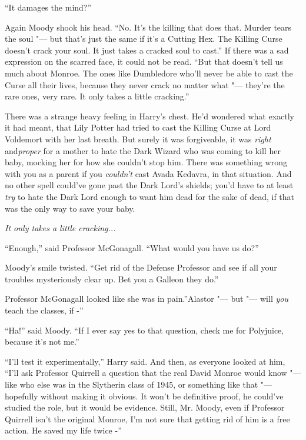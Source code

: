 ``It damages the mind?''

Again Moody shook his head. ``No. It's the killing that does that.
Murder tears the soul "--- but that's just the same if it's a Cutting Hex.
The Killing Curse doesn't crack your soul. It just takes a cracked soul
to cast.'' If there was a sad expression on the scarred face, it could
not be read. ``But that doesn't tell us much about Monroe. The ones like
Dumbledore who'll never be able to cast the Curse all their lives,
because they never crack no matter what "--- they're the rare ones, very
rare. It only takes a little cracking.''

There was a strange heavy feeling in Harry's chest. He'd wondered what
exactly it had meant, that Lily Potter had tried to cast the Killing
Curse at Lord Voldemort with her last breath. But surely it was
forgiveable, it was \emph{right} and\emph{proper} for a mother to hate
the Dark Wizard who was coming to kill her baby, mocking her for how she
couldn't stop him. There was something wrong with you as a parent if you
\emph{couldn't} cast Avada Kedavra, in that situation. And no other
spell could've gone past the Dark Lord's shields; you'd have to at least
\emph{try} to hate the Dark Lord enough to want him dead for the sake of
dead, if that was the only way to save your baby.

\emph{It only takes a little cracking...}

``Enough,'' said Professor McGonagall. ``What would you have us do?''

Moody's smile twisted. ``Get rid of the Defense Professor and see if all
your troubles mysteriously clear up. Bet you a Galleon they do.''

Professor McGonagall looked like she was in pain.''Alastor "--- but "--- will
\emph{you} teach the classes, if -''

``Ha!'' said Moody. ``If I ever say yes to that question, check me for
Polyjuice, because it's not me.''

``I'll test it experimentally,'' Harry said. And then, as everyone
looked at him, ``I'll ask Professor Quirrell a question that the real
David Monroe would know "--- like who else was in the Slytherin class of
1945, or something like that "--- hopefully without making it obvious. It
won't be definitive proof, he could've studied the role, but it would be
evidence. Still, Mr. Moody, even if Professor Quirrell isn't the
original Monroe, I'm not sure that getting rid of him is a free action.
He saved my life twice -''

